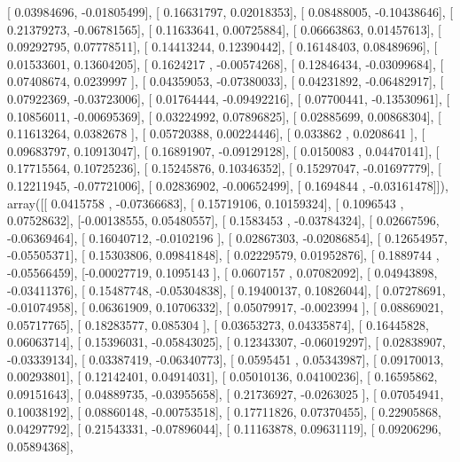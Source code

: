 \documentclass{article}
\begin{document}
       [ 0.03984696, -0.01805499],
       [ 0.16631797,  0.02018353],
       [ 0.08488005, -0.10438646],
       [ 0.21379273, -0.06781565],
       [ 0.11633641,  0.00725884],
       [ 0.06663863,  0.01457613],
       [ 0.09292795,  0.07778511],
       [ 0.14413244,  0.12390442],
       [ 0.16148403,  0.08489696],
       [ 0.01533601,  0.13604205],
       [ 0.1624217 , -0.00574268],
       [ 0.12846434, -0.03099684],
       [ 0.07408674,  0.0239997 ],
       [ 0.04359053, -0.07380033],
       [ 0.04231892, -0.06482917],
       [ 0.07922369, -0.03723006],
       [ 0.01764444, -0.09492216],
       [ 0.07700441, -0.13530961],
       [ 0.10856011, -0.00695369],
       [ 0.03224992,  0.07896825],
       [ 0.02885699,  0.00868304],
       [ 0.11613264,  0.0382678 ],
       [ 0.05720388,  0.00224446],
       [ 0.033862  ,  0.0208641 ],
       [ 0.09683797,  0.10913047],
       [ 0.16891907, -0.09129128],
       [ 0.0150083 ,  0.04470141],
       [ 0.17715564,  0.10725236],
       [ 0.15245876,  0.10346352],
       [ 0.15297047, -0.01697779],
       [ 0.12211945, -0.07721006],
       [ 0.02836902, -0.00652499],
       [ 0.1694844 , -0.03161478]]), array([[ 0.0415758 , -0.07366683],
       [ 0.15719106,  0.10159324],
       [ 0.1096543 ,  0.07528632],
       [-0.00138555,  0.05480557],
       [ 0.1583453 , -0.03784324],
       [ 0.02667596, -0.06369464],
       [ 0.16040712, -0.0102196 ],
       [ 0.02867303, -0.02086854],
       [ 0.12654957, -0.05505371],
       [ 0.15303806,  0.09841848],
       [ 0.02229579,  0.01952876],
       [ 0.1889744 , -0.05566459],
       [-0.00027719,  0.1095143 ],
       [ 0.0607157 ,  0.07082092],
       [ 0.04943898, -0.03411376],
       [ 0.15487748, -0.05304838],
       [ 0.19400137,  0.10826044],
       [ 0.07278691, -0.01074958],
       [ 0.06361909,  0.10706332],
       [ 0.05079917, -0.0023994 ],
       [ 0.08869021,  0.05717765],
       [ 0.18283577,  0.085304  ],
       [ 0.03653273,  0.04335874],
       [ 0.16445828,  0.06063714],
       [ 0.15396031, -0.05843025],
       [ 0.12343307, -0.06019297],
       [ 0.02838907, -0.03339134],
       [ 0.03387419, -0.06340773],
       [ 0.0595451 ,  0.05343987],
       [ 0.09170013,  0.00293801],
       [ 0.12142401,  0.04914031],
       [ 0.05010136,  0.04100236],
       [ 0.16595862,  0.09151643],
       [ 0.04889735, -0.03955658],
       [ 0.21736927, -0.0263025 ],
       [ 0.07054941,  0.10038192],
       [ 0.08860148, -0.00753518],
       [ 0.17711826,  0.07370455],
       [ 0.22905868,  0.04297792],
       [ 0.21543331, -0.07896044],
       [ 0.11163878,  0.09631119],
       [ 0.09206296,  0.05894368],
\end{document}
